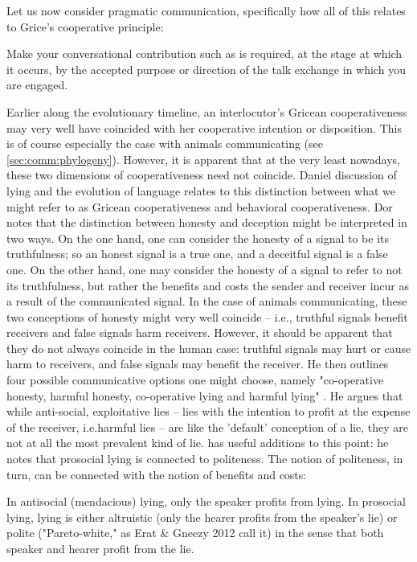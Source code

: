 Let us now consider pragmatic communication, specifically how all of this relates to Grice's cooperative principle: 
\begin{quoting}
    Make your conversational contribution such as is required, at the stage at which it occurs, by the accepted purpose or direction of the talk exchange in which you are engaged.
    \hfill \citep[p.~45]{Grice75}
\end{quoting}
Earlier along the evolutionary timeline, an interlocutor's Gricean cooperativeness may very well have coincided with her cooperative intention or disposition. This is of course especially the case with animals communicating (see \cref{sec:comm:phylogeny}).
However, it is apparent that at the very least nowadays, these two dimensions of cooperativeness need not coincide.
Daniel  discussion of lying and the evolution of language relates to this distinction between what we might refer to as Gricean cooperativeness and behavioral cooperativeness.
Dor notes that the distinction between honesty and deception might be interpreted in two ways. On the one hand, one can consider the honesty of a signal to be its truthfulness; so an honest signal is a true one, and a deceitful signal is a false one. On the other hand, one may consider the honesty of a signal to refer to not its truthfulness, but rather the benefits and costs the sender and receiver incur as a result of the communicated signal. In the case of animals communicating, these two conceptions of honesty might very well coincide -- i.e., truthful signals benefit receivers and false signals harm receivers. However, it should be apparent that they do not always coincide in the human case: truthful signals may hurt or cause harm to receivers, and false signals may benefit the receiver. 
He then outlines four possible communicative options one might choose, namely "co-operative honesty, harmful honesty, co-operative lying and harmful lying" \citep[p.~45]{Dor17}.
He argues that while anti-social, exploitative lies -- lies with the intention to profit at the expense of the receiver, i.e.\@ harmful lies -- are like the 'default' conception of a lie, they are not at all the most prevalent kind of lie. \citet{Meibauer18} has useful additions to this point: he notes that prosocial lying is connected to politeness. The notion of politeness, in turn, can be connected with the notion of benefits and costs:
\begin{quoting}
    In antisocial (mendacious) lying, only the speaker profits from lying. In prosocial lying, lying is either altruistic (only the hearer profits from the speaker's lie) or polite ("Pareto-white," as Erat \& Gneezy 2012 call it) in the sense that both speaker and hearer profit from the lie.
    \hfill \citep[p.~371]{Meibauer18}
\end{quoting}

